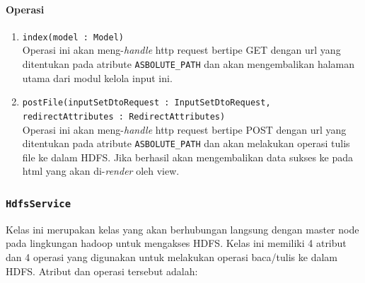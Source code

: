 	\paragraph{Operasi}
		\begin{enumerate}
			\item \texttt{index(model : Model)}\\
			Operasi ini akan meng-\textit{handle} http request bertipe GET dengan url yang ditentukan pada atribute \verb|ASBOLUTE_PATH| dan akan mengembalikan halaman utama dari modul kelola input ini.
			
			\item \texttt{postFile(inputSetDtoRequest : InputSetDtoRequest,
      redirectAttributes : RedirectAttributes)}\\
			Operasi ini akan meng-\textit{handle} http request bertipe POST dengan url yang ditentukan pada atribute \verb|ASBOLUTE_PATH| dan akan melakukan operasi tulis file ke dalam HDFS. Jika berhasil akan mengembalikan data sukses ke pada html yang akan di-\textit{render} oleh view.

		\end{enumerate}
		
		

\subsubsection{\texttt{HdfsService}}
		
	Kelas ini merupakan kelas yang akan berhubungan langsung dengan master node pada lingkungan hadoop untuk mengakses HDFS. Kelas ini memiliki 4 atribut dan 4 operasi yang digunakan untuk melakukan operasi baca/tulis ke dalam HDFS. Atribut dan operasi tersebut adalah:
